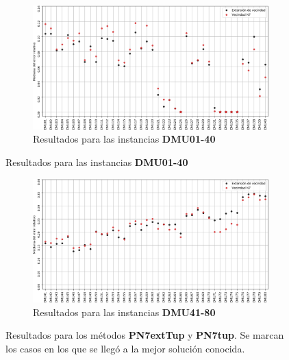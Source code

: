 \begin{figure}[H]
    \begin{subfigure}{\textwidth}
        \centering
        \includegraphics[scale=.6]{Imagenes/n8vsn7err1.png}
        \caption{Resultados para las instancias \textbf{DMU01-40}}
    \end{subfigure}
\end{figure}
\begin{figure}[H]\ContinuedFloat
    \begin{subfigure}{\textwidth}
        \centering
        \includegraphics[scale=.6]{Imagenes/n8vsn7err2.png}
        \caption{Resultados para las instancias \textbf{DMU41-80}}
    \end{subfigure}
    \caption{Resultados para los métodos \textbf{PN7extTup} y \textbf{PN7tup}. Se marcan los casos en los que se llegó a la mejor solución conocida.}
\end{figure}

